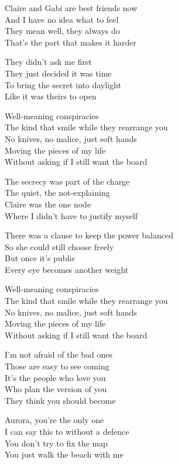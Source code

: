 \begin{lyrics}
Claire and Gabi are best friends now\\
And I have no idea what to feel\\
They mean well, they always do\\
That’s the part that makes it harder

They didn’t ask me first\\
They just decided it was time\\
To bring the secret into daylight\\
Like it was theirs to open

Well-meaning conspiracies\\
The kind that smile while they rearrange you\\
No knives, no malice, just soft hands\\
Moving the pieces of my life\\
Without asking if I still want the board

The secrecy was part of the charge\\
The quiet, the not-explaining\\
Claire was the one node\\
Where I didn’t have to justify myself

There was a clause to keep the power balanced\\
So she could still choose freely\\
But once it’s public\\
Every eye becomes another weight

Well-meaning conspiracies\\
The kind that smile while they rearrange you\\
No knives, no malice, just soft hands\\
Moving the pieces of my life\\
Without asking if I still want the board

I’m not afraid of the bad ones\\
Those are easy to see coming\\
It’s the people who love you\\
Who plan the version of you\\
They think you should become

Aurora, you’re the only one\\
I can say this to without a defence\\
You don’t try to fix the map\\
You just walk the beach with me


\end{lyrics}
